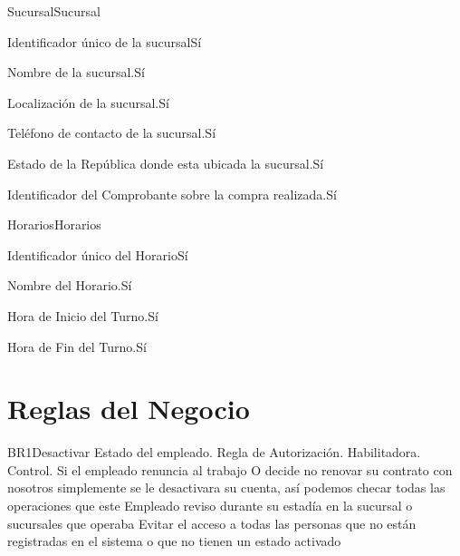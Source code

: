 \begin{cdtEntidad}{Sucursal}{Sucursal}

		{Identificador único de la sucursal}{Sí}
		
		{Nombre de la sucursal.}{Sí}

		{Localización de la sucursal.}{Sí}
	
		{Teléfono de contacto de la sucursal.}{Sí}
		
		{Estado de la República donde esta ubicada la sucursal.}{Sí}
		
		{Identificador del Comprobante sobre la compra realizada.}{Sí}	
\cdtEntityRelSection



\end{cdtEntidad}

\begin{cdtEntidad}{Horarios}{Horarios}

		{Identificador único del Horario}{Sí}
		
		{Nombre del Horario.}{Sí}

		{Hora de Inicio del Turno.}{Sí}
	
		{Hora de Fin del Turno.}{Sí}
		
\end{cdtEntidad}




\newpage
\section{Reglas del Negocio}
\begin{BussinesRule}{BR1}{Desactivar Estado del empleado.}
	\BRitem[Tipo:] Regla de Autorización. 
	\BRitem[Clase:] Habilitadora. 
	\BRitem[Nivel:] Control. %
	\BRitem[Descripción:] Si el empleado renuncia al trabajo O decide no renovar su contrato con nosotros simplemente se le desactivara su cuenta, así podemos checar todas las operaciones que este Empleado reviso durante su estadía en la sucursal o sucursales que operaba
	\BRitem[Motivación:] Evitar el acceso a todas las personas que no están registradas en el sistema o que no tienen un estado activado 
\end{BussinesRule}

